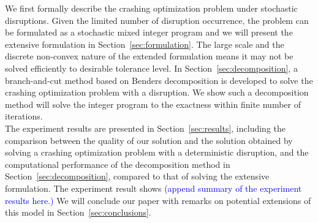 \documentclass[11pt]{article}
\begin{document}
	\newline
	We first formally describe the crashing optimization problem under stochastic disruptions. Given the limited number of disruption occurrence, the problem can be formulated as a stochastic mixed integer program and we will present the extensive formulation in Section~\ref{sec:formulation}. The large scale and the discrete non-convex nature of the extended formulation means it may not be solved efficiently to desirable tolerance level. In Section~\ref{sec:decomposition}, a branch-and-cut method based on Benders decomposition is developed to solve the crashing optimization problem with a disruption. We show such a decomposition method will solve the integer program to the exactness within finite number of iterations.\\
	\newline
	The experiment results are presented in Section~\ref{sec:results}, including the comparison between the quality of our solution and the solution obtained by solving a  crashing optimization problem with a deterministic disruption, and the computational performance of the decomposition method in Section~\ref{sec:decomposition}, compared to that of solving the extensive formulation. The experiment result shows \textcolor{blue}{(append summary of the experiment results here.)} We will conclude our paper with remarks on potential extensions of this model in Section~\ref{sec:conclusions}.
	
\end{document}
